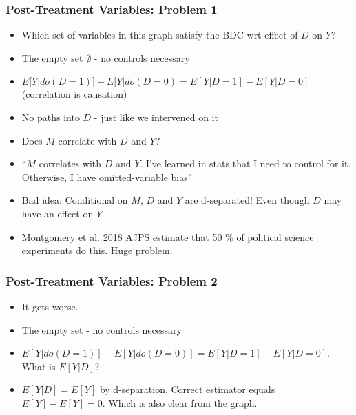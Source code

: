 \documentclass{beamer}
\begin{document}
\begin{frame}[t]
\frametitle{Post-Treatment Variables: Problem 1}
\begin{figure}[ht]
\centering
{}
\end{figure}
\begin{itemize}
\item<1-> Which set of variables in this graph satisfy the BDC wrt effect of $D$ on $Y$?
\item<2-> The empty set $\emptyset$ - no controls necessary
\item<3-> $E[Y|do(D = 1)]- E[Y|do(D = 0) = E[Y|D = 1]- E[Y|D = 0]$ (correlation is causation)
\item<4-> No paths into $D$ - just like we intervened on it
\item<5-> Does $M$ correlate with $D$ and $Y$?
\item<6-> ``$M$ correlates with $D$ and $Y$. I've learned in stats that I need to control for it. Otherwise, I have omitted-variable bias''
\item<7-> Bad idea: Conditional on $M$, $D$ and $Y$ are d-separated! Even though $D$ may have an effect on $Y$
\item<8-> Montgomery et al. 2018 AJPS estimate that 50 \% of political science experiments do this. Huge problem.
\end{itemize}
\end{frame}

\begin{frame}[t]
\frametitle{Post-Treatment Variables: Problem 2}
\begin{figure}[ht]
\centering
{}
\end{figure}
\begin{itemize}
\item<1-> It gets worse. 
\item<3-> The empty set - no controls necessary
\item<4-> $E[Y|do(D = 1)]- E[Y|do(D = 0)] = E[Y|D = 1]- E[Y|D = 0]$. What is $E[Y|D]$?
\item<5-> $E[Y|D] = E[Y]$ by d-separation. Correct estimator equals $E[Y] - E[Y] = 0$. Which is also clear from the graph.
\end{itemize}
\end{frame}
\end{document}
